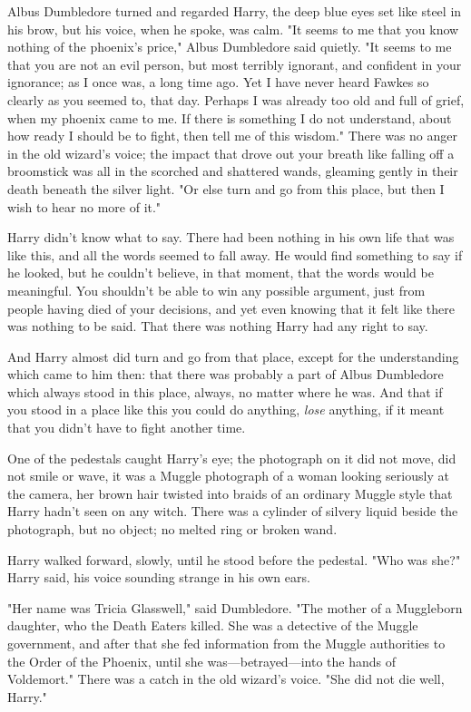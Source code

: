 Albus Dumbledore turned and regarded Harry, the deep blue eyes set like steel
in his brow, but his voice, when he spoke, was calm. "It seems to me that you
know nothing of the phoenix's price," Albus Dumbledore said quietly. "It seems
to me that you are not an evil person, but most terribly ignorant, and
confident in your ignorance; as I once was, a long time ago. Yet I have never
heard Fawkes so clearly as you seemed to, that day. Perhaps I was already too
old and full of grief, when my phoenix came to me. If there is something I do
not understand, about how ready I should be to fight, then tell me of this
wisdom." There was no anger in the old wizard's voice; the impact that drove
out your breath like falling off a broomstick was all in the scorched and
shattered wands, gleaming gently in their death beneath the silver light. "Or
else turn and go from this place, but then I wish to hear no more of it."

Harry didn't know what to say. There had been nothing in his own life that was
like this, and all the words seemed to fall away. He would find something to
say if he looked, but he couldn't believe, in that moment, that the words would
be meaningful. You shouldn't be able to win any possible argument, just from
people having died of your decisions, and yet even knowing that it felt like
there was nothing to be said. That there was nothing Harry had any right to say.

And Harry almost did turn and go from that place, except for the understanding
which came to him then: that there was probably a part of Albus Dumbledore
which always stood in this place, always, no matter where he was. And that if
you stood in a place like this you could do anything, \emph{lose} anything, if
it meant that you didn't have to fight another time.

One of the pedestals caught Harry's eye; the photograph on it did not move, did
not smile or wave, it was a Muggle photograph of a woman looking seriously at
the camera, her brown hair twisted into braids of an ordinary Muggle style that
Harry hadn't seen on any witch. There was a cylinder of silvery liquid beside
the photograph, but no object; no melted ring or broken wand.

Harry walked forward, slowly, until he stood before the pedestal. "Who was
she?" Harry said, his voice sounding strange in his own ears.

"Her name was Tricia Glasswell," said Dumbledore. "The mother of a Muggleborn
daughter, who the Death Eaters killed. She was a detective of the Muggle
government, and after that she fed information from the Muggle authorities to
the Order of the Phoenix, until she was—betrayed—into the hands of
Voldemort." There was a catch in the old wizard's voice. "She did not die well,
Harry."

